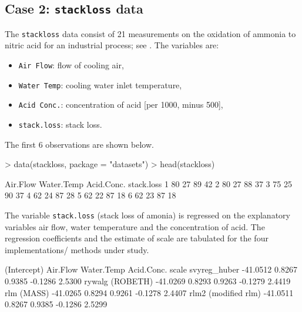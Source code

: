 \documentclass[a4paper]{scrartcl}
\begin{document}
\subsection{Case 2: \texttt{stackloss} data}
The \texttt{stackloss} data consist of 21 measurements on the oxidation of ammonia to nitric acid for an industrial process; see \cite{brownlee}. The variables are: 
\begin{itemize}
   \item \texttt{Air Flow}: flow of cooling air,
   \item \texttt{Water Temp}: cooling water inlet temperature,
   \item \texttt{Acid Conc.}: concentration of acid [per 1000, minus 500],
   \item \texttt{stack.loss}: stack loss.
\end{itemize}

\noindent The first 6 observations are shown below.

\begin{Schunk}
\begin{Sinput}
> data(stackloss, package = "datasets")
> head(stackloss)
\end{Sinput}
\begin{Soutput}
  Air.Flow Water.Temp Acid.Conc. stack.loss
1       80         27         89         42
2       80         27         88         37
3       75         25         90         37
4       62         24         87         28
5       62         22         87         18
6       62         23         87         18
\end{Soutput}
\end{Schunk}

\noindent The variable \texttt{stack.loss} (stack loss of amonia) is regressed on the explanatory variables air flow, water temperature and the concentration of acid. The regression coefficients and the estimate of scale are tabulated for the four implementations/ methods under study. 

\begin{Schunk}
\begin{Soutput}
                    (Intercept) Air.Flow Water.Temp Acid.Conc.  scale
svyreg_huber           -41.0512   0.8267     0.9385    -0.1286 2.5300
rywalg (ROBETH)        -41.0269   0.8293     0.9263    -0.1279 2.4419
rlm (MASS)             -41.0265   0.8294     0.9261    -0.1278 2.4407
rlm2 (modified rlm)    -41.0511   0.8267     0.9385    -0.1286 2.5299
\end{Soutput}
\end{Schunk}
\end{document}
